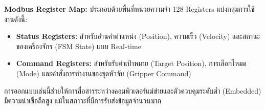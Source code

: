\textbf{Modbus Register Map:} ประกอบด้วยพื้นที่หน่วยความจำ 128 Registers แบ่งกลุ่มการใช้งานดังนี้:
\begin{itemize}
    \item \textbf{Status Registers:} สำหรับอ่านค่าตำแหน่ง (Position), ความเร็ว (Velocity) และสถานะของเครื่องจักร (FSM State) แบบ Real-time
    \item \textbf{Command Registers:} สำหรับรับค่าเป้าหมาย (Target Position), การเลือกโหมด (Mode) และคำสั่งการทำงานของชุดหัวจับ (Gripper Command)
\end{itemize}
การออกแบบเช่นนี้ช่วยให้การสื่อสารระหว่างคอมพิวเตอร์แม่ข่ายและตัวควบคุมระดับต่ำ (Embedded) มีความน่าเชื่อถือสูง แม้ในสภาวะที่มีการรับส่งข้อมูลจำนวนมาก